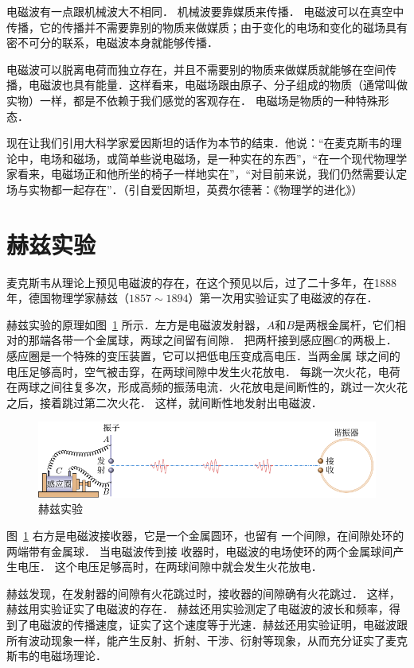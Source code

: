 电磁波有一点跟机械波大不相同．
机械波要靠媒质来传播．
电磁波可以在真空中传播，它的传播并不需要靠别的物质来做媒质；由于变化的电场和变化的磁场具有密不可分的联系，电磁波本身就能够传播．

电磁波可以脱离电荷而独立存在，并且不需要别的物质来做媒质就能够在空间传播，电磁波也具有能量．这样看来，电磁场跟由原子、分子组成的物质（通常叫做实物）一样，都是不依赖于我们感觉的客观存在．
电磁场是物质的一种特殊形态．

现在让我们引用大科学家爱因斯坦的话作为本节的结束．他说：“在麦克斯韦的理论中，电场和磁场，或简单些说电磁场，是一种实在的东西”，“在一个现代物理学家看来，电磁场正和他所坐的椅子一样地实在”，“对目前来说，我们仍然需要认定场与实物都一起存在”．（引自爱因斯坦，英费尔德著：《物理学的进化》）

\section{赫兹实验}
麦克斯韦从理论上预见电磁波的存在，在这个预见以后，过了二十多年，在1888年，德国物理学家赫兹（$1857 \sim 1894$）第一次用实验证实了电磁波的存在．



赫兹实验的原理如图~\ref{fig_C_4-9} 所示．左方是电磁波发射器，$A$和$B$是两根金属杆，它们相对的那端各带一个金属球，两球之间留有间隙．
把两杆接到感应圈$C$的两极上．感应圈是一个特殊的变压装置，它可以把低电压变成高电压．当两金属
球之间的电压足够高时，空气被击穿，在两球间隙中发生火花放电．
每跳一次火花，电荷在两球之间往复多次，形成高频的振荡电流．火花放电是间断性的，跳过一次火花之后，接着跳过第二次火花．
这样，就间断性地发射出电磁波．
\begin{figure}[htbp]
	\centering
	\includegraphics{fig/C/4-9.pdf}
	\caption{赫兹实验}\label{fig_C_4-9}
\end{figure}



图~\ref{fig_C_4-9} 右方是电磁波接收器，它是一个金属圆环，也留有
一个间隙，在间隙处环的两端带有金属球．
当电磁波传到接
收器时，电磁波的电场使环的两个金属球间产生电压．
这个电压足够高时，在两球间隙中就会发生火花放电．

赫兹发现，在发射器的间隙有火花跳过时，接收器的间隙确有火花跳过．
这样，赫兹用实验证实了电磁波的存在．
赫兹还用实验测定了电磁波的波长和频率，得到了电磁波的传播速度，证实了这个速度等于光速．赫兹还用实验证明，电磁波跟所有波动现象一样，能产生反射、折射、干涉、衍射等现象，从而充分证实了麦克斯韦的电磁场理论．

